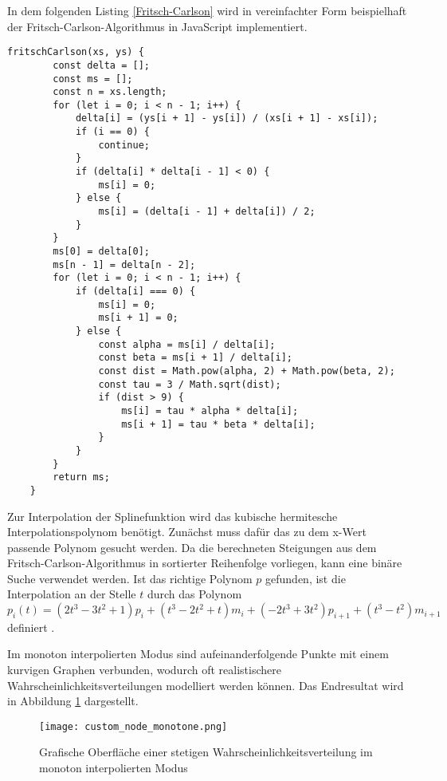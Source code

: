 In dem folgenden Listing \ref{Fritsch-Carlson} wird in vereinfachter Form beispielhaft der Fritsch-Carlson-Algorithmus in JavaScript implementiert.
\begin{lstlisting}[caption=Fritsch-Carlson Methode,label=Fritsch-Carlson]
    fritschCarlson(xs, ys) {
        const delta = [];
        const ms = [];
        const n = xs.length;
        for (let i = 0; i < n - 1; i++) {
            delta[i] = (ys[i + 1] - ys[i]) / (xs[i + 1] - xs[i]);
            if (i == 0) {
                continue;
            }
            if (delta[i] * delta[i - 1] < 0) {
                ms[i] = 0;
            } else {
                ms[i] = (delta[i - 1] + delta[i]) / 2;
            }
        }
        ms[0] = delta[0];
        ms[n - 1] = delta[n - 2];
        for (let i = 0; i < n - 1; i++) {
            if (delta[i] === 0) {
                ms[i] = 0;
                ms[i + 1] = 0;
            } else {
                const alpha = ms[i] / delta[i];
                const beta = ms[i + 1] / delta[i];
                const dist = Math.pow(alpha, 2) + Math.pow(beta, 2);
                const tau = 3 / Math.sqrt(dist);
                if (dist > 9) {
                    ms[i] = tau * alpha * delta[i];
                    ms[i + 1] = tau * beta * delta[i];
                }
            }
        }
        return ms;
    }
\end{lstlisting}

Zur Interpolation der Splinefunktion wird das kubische hermitesche Interpolationspolynom benötigt. Zunächst muss dafür das zu dem x-Wert passende Polynom gesucht werden. Da die berechneten Steigungen aus dem Fritsch-Carlson-Algorithmus in sortierter Reihenfolge vorliegen, kann eine binäre Suche verwendet werden. Ist das richtige Polynom $p$ gefunden, ist die Interpolation an der Stelle $t$ durch das Polynom
$$p_i(t)=(2t^3-3t^2+1)p_i+(t^3-2t^2+t)m_i+(-2t^3+3t^2)p_{i+1}+(t^3-t^2)m_{i+1}$$
definiert \cite{Pat:2009}.

Im monoton interpolierten Modus sind aufeinanderfolgende Punkte mit einem kurvigen Graphen verbunden, wodurch oft realistischere Wahrscheinlichkeitsverteilungen modelliert werden können. Das Endresultat wird in Abbildung \ref{fig:customnodemonotone} dargestellt.

\begin{figure}[H]
    \centering
    \texttt{[image: custom\_node\_monotone.png]}
    \caption{Grafische Oberfläche einer stetigen Wahrscheinlichkeitsverteilung im monoton interpolierten Modus}
    \label{fig:customnodemonotone}
\end{figure}

